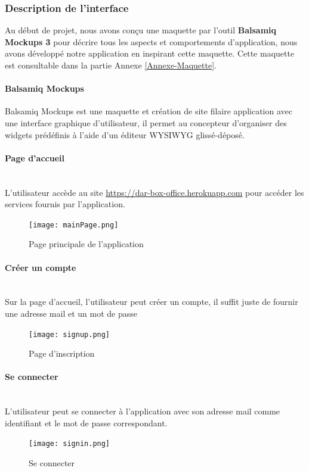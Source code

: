 \documentclass[12pt]{article}
\begin{document}
\subsubsection{Description de l'interface}
Au début de projet, nous avons conçu une maquette par l'outil \textbf{Balsamiq Mockups 3} pour décrire tous les aspects et comportements d'application, nous avons développé notre application en inspirant cette maquette. Cette maquette est consultable dans la partie Annexe  \hyperref[Annexe-Maquette]{\ref*{Annexe-Maquette}}. 
\paragraph{Balsamiq Mockups} Balsamiq Mockups est une maquette et création de site filaire application avec une interface graphique d'utilisateur, il permet au concepteur d’organiser des widgets prédéfinis à l’aide d’un éditeur WYSIWYG glissé-déposé.\cite{Balsamiq-Mockups}



\paragraph{Page d'accueil}
\leavevmode \\
L'utilisateur accède au site \url{https://dar-box-office.herokuapp.com} pour accéder les services fournis par l'application. 
\begin{figure}[H]
    \centering
    \texttt{[image: mainPage.png]}
    \caption{Page principale de l'application}
    \label{fig:App_mainPag}
\end{figure}

\paragraph{Créer un compte}
\leavevmode \\
 Sur la page d'accueil, l'utilisateur peut créer un compte, il suffit juste de  fournir une adresse mail et un mot de passe
\begin{figure}[H]
    \centering
    \texttt{[image: signup.png]}
    \caption{Page d'inscription}
    \label{fig:AppInscription}
\end{figure}
\paragraph{Se connecter}
\leavevmode \\
L'utilisateur peut se connecter à l'application avec son adresse mail comme identifiant et le mot de passe correspondant.
\begin{figure}[H]
    \centering
    \texttt{[image: signin.png]}
    \caption{Se connecter}
    \label{fig:App_signin}
\end{figure}
\end{document}
